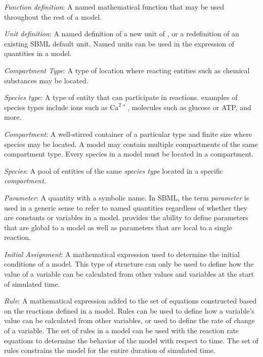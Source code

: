 \begin{description}
  
\item \emph{Function definition}: A named mathematical function
  that may be used throughout the rest of a model.

\item \emph{Unit definition}: A named definition of a new
  unit of , or a redefinition of an existing SBML default
  unit.  Named units can be used in the expression of quantities
  in a model.

\item \emph{Compartment Type}: A type of location where
  reacting entities such as chemical substances may be located.

\item \emph{Species type}: A type of entity
  that can participate in reactions.   examples of species types
  include ions such as $\text{Ca}^{2+}$, molecules such as
  glucose or ATP, and more.

\item \emph{Compartment}: A well-stirred container of a
  particular type and finite size where species may be located.
  A model may contain multiple compartments of the same
  compartment type.  Every species in a model must be located in
  a compartment.

\item \emph{Species}: A pool of entities of the same
  \emph{species type} located in a specific \emph{compartment}.

\item \emph{Parameter}: A quantity with a symbolic name.
  In SBML, the term \emph{parameter} is used in a generic sense
  to refer to named quantities regardless of whether they are
  constants or variables in a model.  \sbmltwo provides the
  ability to define parameters that are global to a model as
  well as parameters that are local to a single reaction.
  
\item \emph{Initial Assignment}: A mathematical
  expression used to determine the initial conditions of a
  model.  This type of structure can only be used to define how
  the value of a variable can be calculated from other values
  and variables at the start of simulated time.
  
\item \emph{Rule}: A mathematical expression added to the set of
  equations constructed based on the reactions defined in a model.
  Rules can be used to define how a variable's value can
  be calculated from other variables, or used to define the rate
  of change of a variable.  The set of rules in a model can be
  used with the reaction rate equations to determine the
  behavior of the model with respect to time.  The set of rules
  constrains the model for the entire duration of simulated
  time.


\end{description}
